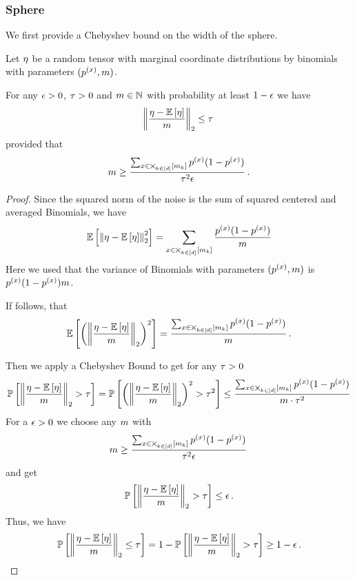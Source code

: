 \subsubsection{Sphere}

We first provide a Chebyshev bound on the width of the sphere.

\begin{theorem}\label{the:sphereBoundVariance}
	Let $\eta$ be a random tensor with marginal coordinate distributions by binomials with parameters $(p^{(x)},m)$.

	For any $\epsilon>0$, $\tau>0$ and $m\in\mathbb{N}$ with probability at least $1-\epsilon$ we have
		\[ \left\|\frac{\eta-\mathbb{E}\left[\eta\right]}{m}\right\|_{2} \leq   \tau \, \]
	provided that
		\[ m \geq  \frac{ \sum_{x\in\bigtimes_{k\in[d]}[m_{k}]} p^{(x)}(1-p^{(x)})}{\tau^2 \epsilon} \, . \]
\end{theorem}
\begin{proof}
	Since the squared norm of the noise is the sum of squared centered and averaged Binomials, we have
		\[  \mathbb{E}\left[\left\|\eta-\mathbb{E}\left[\eta\right]\right\|_{2}^2\right]  
		= \sum_{x\in\bigtimes_{k\in[d]}[m_{k}]} \frac{p^{(x)}(1-p^{(x)})}{m} \]
	Here we used that the variance of Binomials with parameters $(p^{(x)},m)$ is $p^{(x)}(1-p^{(x)}) m$.
	
	If follows, that 
		\[ \mathbb{E}\left[\left(\left\|\frac{\eta-\mathbb{E}\left[\eta\right]}{m}\right\|_{2}\right)^2\right] =  \frac{ \sum_{x\in\bigtimes_{k\in[d]}[m_{k}]} p^{(x)}(1-p^{(x)})}{m} \, . \]
	
	Then we apply a Chebyshev Bound to get for any $\tau>0$
	\begin{align}
		\mathbb{P}\left[\left\|\frac{\eta-\mathbb{E}\left[\eta\right]}{m}\right\|_{2} > \tau\right]
		= \mathbb{P}\left[\left(\left\|\frac{\eta-\mathbb{E}\left[\eta\right]}{m}\right\|_{2}\right)^2 > \tau^2\right]
		\leq \frac{ \sum_{x\in\bigtimes_{k\in[d]}[m_{k}]} p^{(x)}(1-p^{(x)})}{m \cdot \tau^2}
	\end{align} 
	For a $\epsilon>0$ we choose any $m$ with
		\[ m \geq  \frac{ \sum_{x\in\bigtimes_{k\in[d]}[m_{k}]} p^{(x)}(1-p^{(x)})}{\tau^2 \epsilon} \, \]
	and get 
	\begin{align}
		\mathbb{P}\left[\left\|\frac{\eta-\mathbb{E}\left[\eta\right]}{m}\right\|_{2} > \tau\right] \leq \epsilon \, .
	\end{align} 
	Thus, we have 
	\begin{align}
		\mathbb{P}\left[\left\|\frac{\eta-\mathbb{E}\left[\eta\right]}{m}\right\|_{2} \leq \tau\right] = 1 - \mathbb{P}\left[\left\|\frac{\eta-\mathbb{E}\left[\eta\right]}{m}\right\|_{2} > \tau\right]  \geq 1-\epsilon \, .
	\end{align} 
\end{proof}


